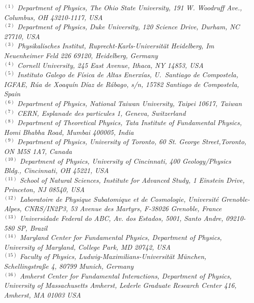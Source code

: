 \vspace{0.5cm}

{\footnotesize
\begin{center}
$^{(1)}$ \emph{Department of Physics, The Ohio State University, 191 W. Woodruff Ave., Columbus, OH 43210-1117, USA}\\
$^{(2)}$ \emph{Department of Physics, Duke University, 120 Science Drive, Durham, NC 27710, USA}\\
$^{(3)}$ \emph{Physikalisches Institut, Ruprecht-Karls-Universit\"at Heidelberg, Im Neuenheimer Feld 226 69120, Heidelberg, Germany}\\
$^{(4)}$ \emph{Cornell University, 245 East Avenue, Ithaca, NY 14853, USA}\\
$^{(5)}$ \emph{Instituto Galego de F\'isica de Altas Enerx\'ias, U.~Santiago de Compostela, IGFAE, R\'ua de Xoaqu\'in D\'iaz de R\'abago, s/n, 15782 Santiago de Compostela, Spain}\\
$^{(6)}$ \emph{Department of Physics, National Taiwan University, Taipei 10617, Taiwan}\\
$^{(7)}$ \emph{CERN, Esplanade des particules 1, Geneva,  Switzerland}\\
$^{(8)}$ \emph{Department of Theoretical Physics, Tata Institute of Fundamental Physics,  Homi Bhabha Road, Mumbai 400005, India}\\
$^{(9)}$ \emph{Department of Physics, University of Toronto, 60 St. George Street,Toronto, ON M5S 1A7, Canada}\\
$^{(10)}$ \emph{Department of Physics, University of Cincinnati, 400 Geology/Physics Bldg., Cincinnati, OH 45221, USA}\\
$^{(11)}$ \emph{School of Natural Sciences, Institute for Advanced Study, 1 Einstein Drive, Princeton, NJ 08540, USA}\\
$^{(12)}$ \emph{Laboratoire de Physique Subatomique et de Cosmologie, Universit\'e   Grenoble-Alpes, CNRS/IN2P3, 53 Avenue des Martyrs, F-38026 Grenoble, France}\\
$^{(13)}$ \emph{Universidade Federal do ABC, Av. dos Estados, 5001, Santo Andre, 09210-580 SP, Brazil}\\
$^{(14)}$ \emph{Maryland Center for Fundamental Physics,  Department of Physics, University of Maryland, College Park, MD 20742, USA}\\
$^{(15)}$ \emph{Faculty of Physics, Ludwig-Maximilians-Universit\"at M\"unchen, Schellingstra\ss e 4, 80799 Munich, Germany}\\
$^{(16)}$ \emph{Amherst Center for Fundamental Interactions, Department of Physics, University of Massachusetts Amherst, Lederle Graduate Research Center 416, Amherst, MA 01003 USA}\\

\end{center}}
